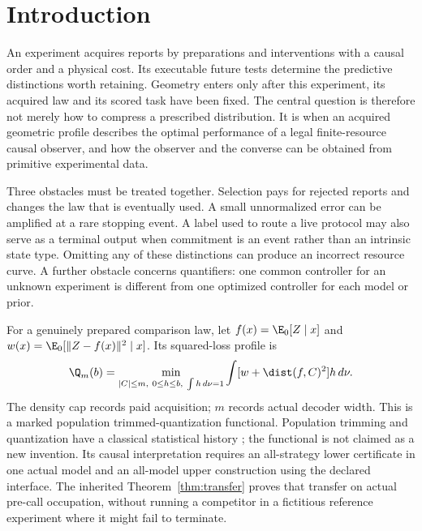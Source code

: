 \section{Introduction}
An experiment acquires reports by preparations and interventions with a causal order and a physical cost. Its executable future tests determine the predictive distinctions worth retaining. Geometry enters only after this experiment, its acquired law and its scored task have been fixed. The central question is therefore not merely how to compress a prescribed distribution. It is when an acquired geometric profile describes the optimal performance of a legal finite-resource causal observer, and how the observer and the converse can be obtained from primitive experimental data.

Three obstacles must be treated together. Selection pays for rejected reports and changes the law that is eventually used. A small unnormalized error can be amplified at a rare stopping event. A label used to route a live protocol may also serve as a terminal output when commitment is an event rather than an intrinsic state type. Omitting any of these distinctions can produce an incorrect resource curve. A further obstacle concerns quantifiers: one common controller for an unknown experiment is different from one optimized controller for each model or prior.

For a genuinely prepared comparison law, let $f(x)=\E_0[Z\mid x]$ and $w(x)=\E_0[\|Z-f(x)\|^2\mid x]$. Its squared-loss profile is
\[
 \Q_m(b)=\min_{|C|\le m,\ 0\le h\le b,\ \int h\,d\nu=1}
     \int [w+\dist(f,C)^2]h\,d\nu.
\]
The density cap records paid acquisition; $m$ records actual decoder width. This is a marked population trimmed-quantization functional. Population trimming and quantization have a classical statistical history \cite{CGM97,GG99}; the functional is not claimed as a new invention. Its causal interpretation requires an all-strategy lower certificate in one actual model and an all-model upper construction using the declared interface. The inherited Theorem~\ref{thm:transfer} proves that transfer on actual pre-call occupation, without running a competitor in a fictitious reference experiment where it might fail to terminate.

